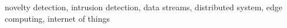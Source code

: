 \ifdefined\IEEEkeywords
\begin{IEEEkeywords}
  novelty detection, intrusion detection, data streams,
  distributed system, edge computing, internet of things
\end{IEEEkeywords}
\else
{}
\fi
